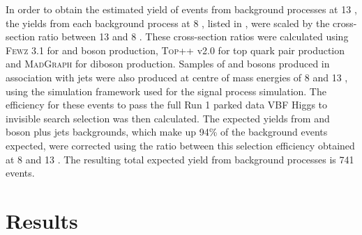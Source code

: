 In order to obtain the estimated yield of events from background processes at 13 \TeV, the yields from each background process at 8 \TeV, listed in , were scaled by the cross-section ratio between 13 and 8 \TeV. These cross-section ratios were calculated using \textsc{Fewz} 3.1 for \PW and \PZ boson production, \textsc{Top++} v2.0 for top quark pair production and \textsc{MadGraph} for diboson production. Samples of \PW and \PZ bosons produced in association with jets were also produced at centre of mass energies of 8 and 13 \TeV, using the simulation framework used for the signal process simulation. The efficiency for these events to pass the full Run 1 parked data \ac{VBF} Higgs to invisible search selection was then calculated. The expected yields from \PW and \PZ boson plus jets backgrounds, which make up 94\% of the background events expected, were corrected using the ratio between this selection efficiency obtained at 8 and 13 \TeV. The resulting total expected yield from background processes is 741 events.




\section{Results}
\label{sec:dmresults}

